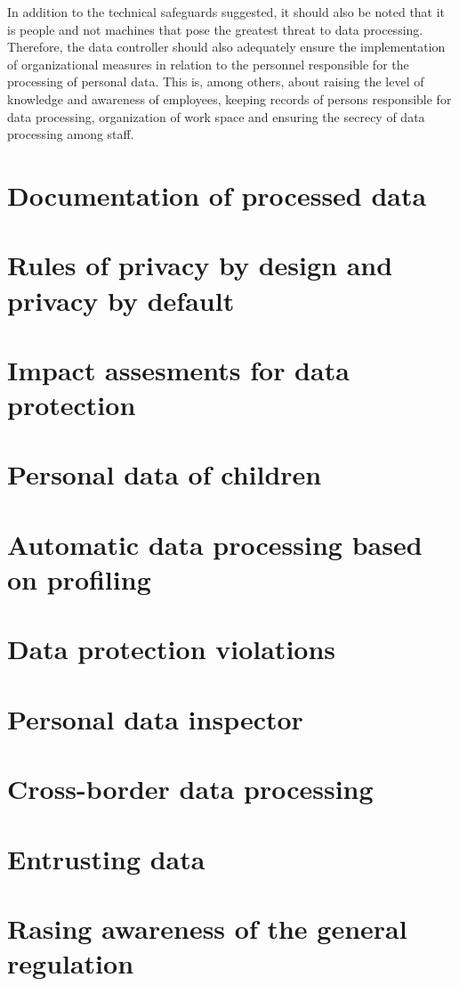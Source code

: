 \documentclass[en, noamssymb]{mgr}
\begin{document}
In addition to the technical safeguards suggested, it should also be noted that it is people and not machines that pose the greatest threat to data processing. Therefore, the data controller should also adequately ensure the implementation of organizational measures in relation to the personnel responsible for the processing of personal data. This is, among others, about raising the level of knowledge and awareness of employees, keeping records of persons responsible for data processing, organization of work space and ensuring the secrecy of data processing among staff.

\section{Documentation of processed data}
\section{Rules of privacy by design and privacy by default}
\section{Impact assesments for data protection}
\section{Personal data of children}
\section{Automatic data processing based on profiling}
\section{Data protection violations}
\section{Personal data inspector}
\section{Cross-border data processing}
\section{Entrusting data}
\section{Rasing awareness of the general regulation}
\end{document}
